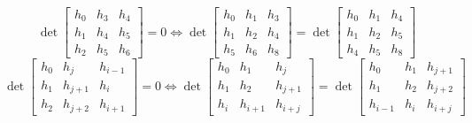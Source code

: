 $$ \det \left[\begin{matrix}{h}_{0} & {h}_{3} & {h}_{4}\\{h}_{1} & {h}_{4} & {h}_{5}\\{h}_{2} & {h}_{5} & {h}_{6}\end{matrix}\right] = 0 \Leftrightarrow \det \left[\begin{matrix}{h}_{0} & {h}_{1} & {h}_{3}\\{h}_{1} & {h}_{2} & {h}_{4}\\{h}_{5} & {h}_{6} & {h}_{8}\end{matrix}\right] = \det \left[\begin{matrix}{h}_{0} & {h}_{1} & {h}_{4}\\{h}_{1} & {h}_{2} & {h}_{5}\\{h}_{4} & {h}_{5} & {h}_{8}\end{matrix}\right] $$
$$ \det \left[\begin{matrix}{h}_{0} & {h}_{j} & {h}_{i - 1}\\{h}_{1} & {h}_{j + 1} & {h}_{i}\\{h}_{2} & {h}_{j + 2} & {h}_{i + 1}\end{matrix}\right] = 0 \Leftrightarrow \det \left[\begin{matrix}{h}_{0} & {h}_{1} & {h}_{j}\\{h}_{1} & {h}_{2} & {h}_{j + 1}\\{h}_{i} & {h}_{i + 1} & {h}_{i + j}\end{matrix}\right] = \det \left[\begin{matrix}{h}_{0} & {h}_{1} & {h}_{j + 1}\\{h}_{1} & {h}_{2} & {h}_{j + 2}\\{h}_{i - 1} & {h}_{i} & {h}_{i + j}\end{matrix}\right] $$
